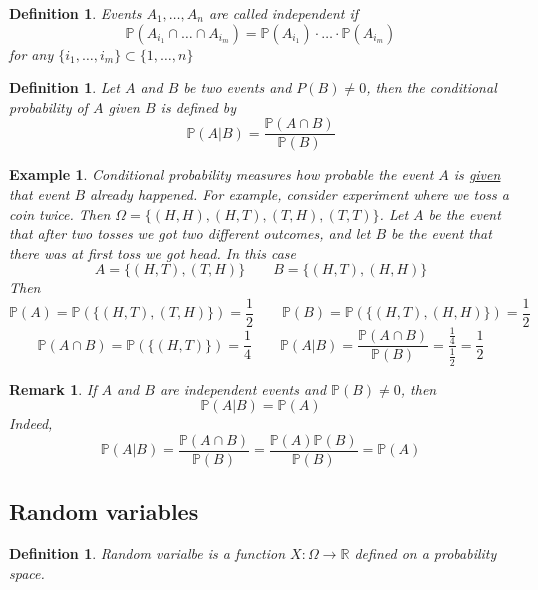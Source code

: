 \documentclass[12pt]{article}
\newtheorem{remark}[theorem]{Remark}
\newtheorem{definition}[theorem]{Definition}
\newtheorem{example}[theorem]{Example}
\begin{document}
\begin{definition} Events $A_1,\ldots,A_n$ are called independent if
    $$
        \mathbb{P}(A_{i_1}\cap\ldots\cap A_{i_m})
        =\mathbb{P}(A_{i_1})\cdot
        \ldots
        \cdot\mathbb{P}(A_{i_m})
    $$
    for any $\{i_1,\ldots,i_m\}\subset \{1,\ldots,n\}$
\end{definition}

\begin{definition} Let $A$ and $B$ be two events and $P(B)\neq 0$, then the
    conditional probability of $A$ given $B$ is defined by
    $$
        \mathbb{P}(A|B)=\frac{\mathbb{P}(A\cap B)}{\mathbb{P}(B)}
    $$
\end{definition}

\begin{example} Conditional probability measures how probable the event $A$ is
    \underline{given} that event $B$ already happened. For example, consider
    experiment where we toss a coin twice. Then $\Omega=\{(H, H), (H, T), (T,H),
        (T,T)\}$. Let $A$ be the event that after two tosses we got two different
    outcomes, and let $B$ be the event that there was at first toss we got head.
    In this case
    $$
        A=\{(H,T),(T,H)\}\quad\quad B=\{(H,T),(H,H)\}
    $$
    Then
    $$
        \mathbb{P}(A)=\mathbb{P}(\{(H,T),(T,H)\})
        =\frac{1}{2}\quad\quad \mathbb{P}(B)
        =\mathbb{P}(\{(H,T),(H,H)\})=\frac{1}{2}
    $$
    $$
        \mathbb{P}(A\cap B)=\mathbb{P}(\{(H,T)\})
        =\frac{1}{4}\quad\quad \mathbb{P}(A|B)
        =\frac{\mathbb{P}(A\cap B)}{\mathbb{P}(B)}
        =\frac{\frac{1}{4}}{\frac{1}{2}}=\frac{1}{2}
    $$
\end{example}

\begin{remark} If $A$ and $B$ are independent events and $\mathbb{P}(B)\neq 0$,
    then
    $$
        \mathbb{P}(A|B)=\mathbb{P}(A)
    $$
    Indeed,
    $$
        \mathbb{P}(A|B)
        =\frac{\mathbb{P}(A\cap B)}{\mathbb{P}(B)}
        =\frac{\mathbb{P}(A)\mathbb{P}(B)}{\mathbb{P}(B)}=\mathbb{P}(A)
    $$
\end{remark}


\subsection{Random variables}

\begin{definition} Random varialbe is a function $X:\Omega\to \mathbb{R}$
    defined on a probability space.
\end{definition}
\end{document}
